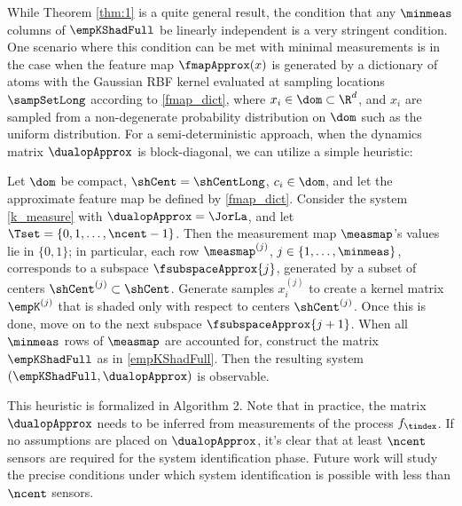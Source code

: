 While Theorem \ref{thm:1} is a quite general result, the condition that any $\minmeas$ columns of $\empKShadFull$ be linearly independent is a very stringent condition. 
One scenario where this condition can be met with minimal measurements is in the case when the feature map $\fmapApprox(x)$ is generated by a dictionary of atoms with the Gaussian RBF kernel evaluated at sampling locations $\sampSetLong$ according to \eqref{fmap_dict}, where $x_i\in\dom\subset\R^d$, and $x_i$ are sampled from a non-degenerate probability distribution on $\dom$ such as the uniform distribution. For a semi-deterministic approach, when the dynamics matrix $\dualopApprox$ is block-diagonal, we can utilize a simple heuristic:
\begin{remark}\label{rem:1}
	Let $\dom$ be compact, $\shCent = \shCentLong$, $c_i\in\dom$, and let the approximate feature map be defined by \eqref{fmap_dict}. Consider the system \eqref{k_measure} with $\dualopApprox=\JorLa$, and let $\Tset = \{0,1,\dots,\ncent-1\}$. Then the measurement map $\measmap$'s values lie in $\{0, 1\}$; in particular, each row $\measmap^{(j)}$, $j\in\{1,\dots,\minmeas\}$, corresponds to a subspace $\fsubspaceApprox{j}$, generated by a subset of centers $\shCent^{(j)}\subset\shCent$. Generate samples $x_i^{(j)}$ to create a kernel matrix $\empK^{(j)}$ that is shaded only with respect to centers $\shCent^{(j)}$. Once this is done, move on to the next subspace $\fsubspaceApprox{j+1}$. When all $\minmeas$ rows of $\measmap$ are accounted for, construct the matrix $\empKShadFull$ as in \eqref{empKShadFull}. Then the resulting system $(\empKShadFull, \dualopApprox)$ is observable. 
\end{remark}
This heuristic is formalized in Algorithm 2. Note that in practice, the matrix $\dualopApprox$ needs to be inferred from measurements of the process $f_{\tindex}$. If no assumptions are placed on $\dualopApprox$, it's clear that at least $\ncent$ sensors are required for the system identification phase. Future work will study the precise conditions under which system identification is possible with less than $\ncent$ sensors.
